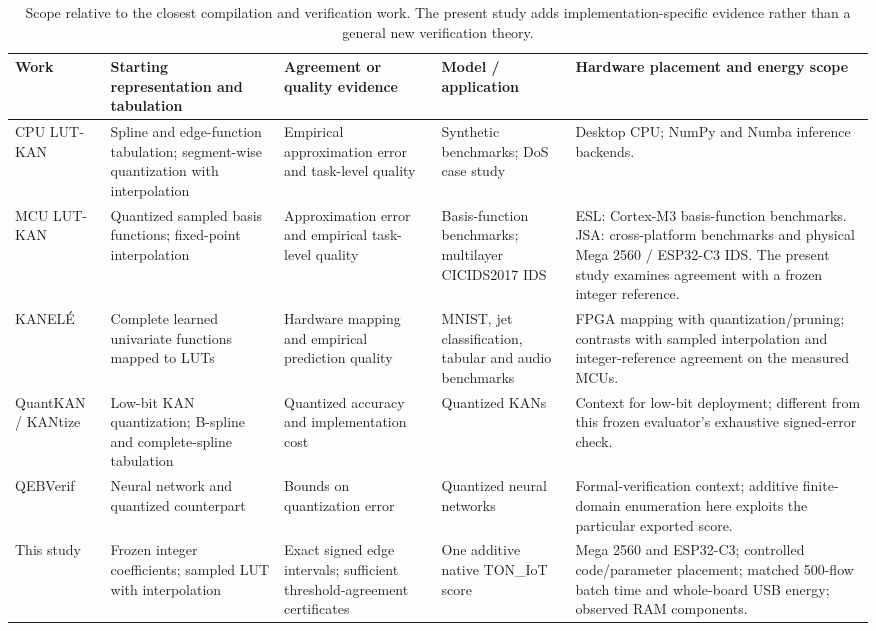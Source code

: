 \begin{table}[t]
\caption{Scope relative to the closest compilation and verification work. The present study adds implementation-specific evidence rather than a general new verification theory.}
\label{tab:related-work}
\centering\scriptsize\setlength{\tabcolsep}{3pt}
\begin{tabular}{p{2.25cm}p{3.35cm}p{3.3cm}p{2.75cm}p{4.85cm}}
\toprule
Work & Starting representation and tabulation & Agreement or quality evidence & Model / application & Hardware placement and energy scope\\
\midrule
CPU LUT-KAN~\cite{kuznetsov2026toolkit} & Spline and edge-function tabulation; segment-wise quantization with interpolation & Empirical approximation error and task-level quality & Synthetic benchmarks; DoS case study & Desktop CPU; NumPy and Numba inference backends.\\
MCU LUT-KAN~\cite{kuznetsov2026esl,kuznetsov2026mculut} & Quantized sampled basis functions; fixed-point interpolation & Approximation error and empirical task-level quality & Basis-function benchmarks; multilayer CICIDS2017 IDS & ESL: Cortex-M3 basis-function benchmarks. JSA: cross-platform benchmarks and physical Mega 2560 / ESP32-C3 IDS. The present study examines agreement with a frozen integer reference.\\
KANEL\'{E}~\cite{Hoang2025KANELE} & Complete learned univariate functions mapped to LUTs & Hardware mapping and empirical prediction quality & MNIST, jet classification, tabular and audio benchmarks & FPGA mapping with quantization/pruning; contrasts with sampled interpolation and integer-reference agreement on the measured MCUs.\\
QuantKAN / KANtize~\cite{fuad2025quantkan,errabii2026kantize} & Low-bit KAN quantization; B-spline and complete-spline tabulation & Quantized accuracy and implementation cost & Quantized KANs & Context for low-bit deployment; different from this frozen evaluator's exhaustive signed-error check.\\
QEBVerif~\cite{zhang2023qebverif} & Neural network and quantized counterpart & Bounds on quantization error & Quantized neural networks & Formal-verification context; additive finite-domain enumeration here exploits the particular exported score.\\
This study & Frozen integer coefficients; sampled LUT with interpolation & Exact signed edge intervals; sufficient threshold-agreement certificates & One additive native TON\_IoT score & Mega 2560 and ESP32-C3; controlled code/parameter placement; matched 500-flow batch time and whole-board USB energy; observed RAM components.\\
\bottomrule
\end{tabular}
\end{table}
